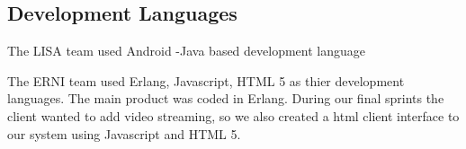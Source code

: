 \subsection{Development Languages}

The LISA team used Android -Java based development language

The ERNI team used Erlang, Javascript, HTML 5  as thier development languages. The main product was coded in Erlang. During our final sprints the client wanted to add video streaming, so we also created a html client interface to our system using Javascript and HTML 5. 
